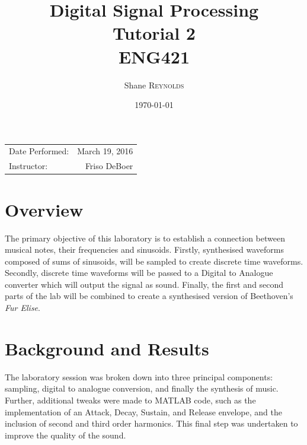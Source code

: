 \documentclass{article}
\title{Digital Signal Processing \\ Tutorial 2 \\ ENG421} %
\author{Shane \textsc{Reynolds}} %
\date{\today} %
\begin{document}
\maketitle %

\begin{center}
\begin{tabular}{l r}
Date Performed: & March 19, 2016 \\ %
Instructor: & Friso DeBoer %
\end{tabular}
\end{center}

\tableofcontents
\newpage


\section{Overview}
The primary objective of this laboratory is to establish a connection between musical notes, their frequencies and sinusoids. Firstly, synthesised waveforms composed of sums of sinusoids, will be sampled to create discrete time waveforms. Secondly, discrete time waveforms will be passed to a Digital to Analogue converter which will output the signal as sound. Finally, the first and second parts of the lab will be combined to create a synthesised version of Beethoven's \textit{Fur Elise}.



\section{Background and Results}
The laboratory session was broken down into three principal components: sampling, digital to analogue conversion, and finally the synthesis of music. Further, additional tweaks were made to MATLAB code, such as the implementation of an Attack, Decay, Sustain, and Release envelope, and the inclusion of second and third order harmonics. This final step was undertaken to improve the quality of the sound.
\end{document}
